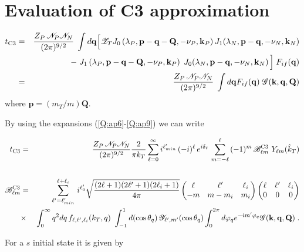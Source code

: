 \section{Evaluation of C3 approximation}

\begin{eqnarray} \label{Q:ap11}
t_{{\rm C3}} &=& \frac{Z_{P}\, \mathcal{N}_{P}
\mathcal{N}_{N}}{(2\pi)^{9/2}} \; \int d \mathbf{q} \Big[
\mathcal{Z}_{T} J_{0} \left( \lambda_{P}, \mathbf{p}- \textbf{q} -
\mathbf{Q},-\nu_{P},\mathbf{k}_{P} \right) J_{1}( \lambda_{N}, \mathbf{p}-\mathbf{q},
-\nu_{N}, \mathbf{k}_{N} )
  \nonumber \\
&& - \; J_{1} \left( \lambda_{P}, \mathbf{p}- \textbf{q} -
\mathbf{Q},-\nu_{P},\mathbf{k}_{P} \right) \; J_{0}( \lambda_{N},
\mathbf{p}-\mathbf{q}, -\nu_{N}, \mathbf{k}_{N} ) \, \Big] \; F_{if}(\mathbf{q} )
\nonumber
\\
&=& \frac{Z_{P}\, \mathcal{N}_{P} \mathcal{N}_{N}}{(2\pi)^{9/2}} \;
\int d \mathbf{q} F_{if}(\mathbf{q} ) \; \mathcal{G}(\mathbf{k},\mathbf{q},\mathbf{Q})
\end{eqnarray}
where $\bm{p}=(m_{T}/m)\bm{Q}$.

By using the expansions (\ref{Q:ap6}-\ref{Q:ap9}) we can write

\begin{eqnarray}\label{Q:ap13}
t_{{\rm C3}} &=& \frac{Z_{P} \, \mathcal{N}_{P}
\mathcal{N}_{N}}{(2\pi)^{9/2}} \frac{2}{\pi k_{T}}
\sum_{\ell=0}^{\infty} i^{\ell'_{min}} \, (-i)^{\ell} \,
e^{i \delta_{\ell}} \, \sum_{m=-\ell}^{\ell} \, (-1)^{m} \,
\mathcal{B}^{\mathrm{C3}}_{\ell m} \ Y_{\ell m}(\hat{k}_{T})
\\
\nonumber
\\
\mathcal{B}^{\mathrm{C3}}_{\ell m} &=& \sum_{\ell'=\ell'_{min}}^{\ell +
\ell_{i}} \, i^{\ell'_{0}} \sqrt{\frac{(2 \ell + 1)(2 \ell' + 1)(2
\ell_{i} + 1)}{4 \pi }}\left( \begin{matrix}\ell & \ell' & \ell_{i} \cr -m &
m-m_{i} & m_{i}
\end{matrix}
\right) \left( \begin{matrix}\ell & \ell' & \ell_{i} \cr 0 &
0 & 0
\end{matrix}
\right) \nonumber
\\
&{\times}& \int_{0}^{\infty} q^{2} d q \, f_{\ell,\ell',\ell_{i}}(k_{T},q)
\ \int_{-1}^{1}d (\cos \theta_{q}) \, \mathcal{Y}_{\ell',m'}(\cos
\theta_{q}) \int_{0}^{2 \pi} d \varphi_{q} e^{-i m'
\varphi_{q}} \mathcal{G}(\mathbf{k},\mathbf{q},\mathbf{Q}) \;.  \nonumber
\end{eqnarray}

For a $s$ initial state it is given by

